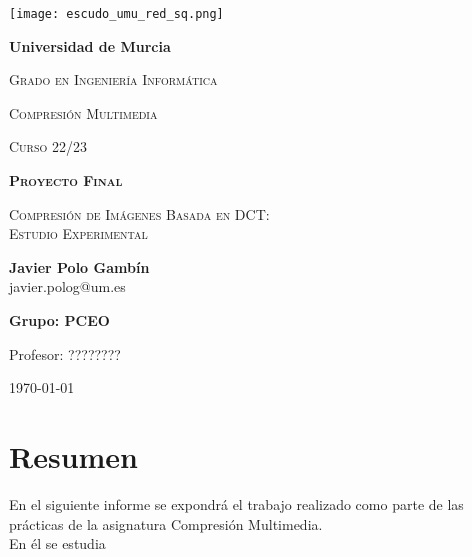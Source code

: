 \documentclass[12pt,a4paper]{article}
\begin{document}
\begin{titlepage}
\centering
{\texttt{[image: escudo\_umu\_red\_sq.png]}\par}
\vspace{1cm}
{\bfseries\LARGE Universidad de Murcia \par}
\vspace{0.5cm}
{\scshape\Large Grado en Ingeniería Informática \par}
\vspace{0.5cm}
{\scshape\Large Compresión Multimedia \par}
{\scshape\Large Curso 22/23 \par}
\vspace{1cm}
{\scshape\Huge \textbf{Proyecto Final\\} \par}
\vspace{0.5cm}
{\scshape \Large Compresión de Imágenes Basada en DCT:\\Estudio Experimental \par}
\vspace{1.5cm}
\vfill


{ \Large\textbf{Javier Polo Gambín} \\
javier.polog@um.es\par}
\vspace{0.7cm}
{\textbf{Grupo: PCEO}\par}
\vspace{0.7cm}
\vfill
{\large Profesor: ???????? \par}
\vfill
{\Large \date{\today} \par}
\vfill
{\large \today \par}
\end{titlepage}

\newpage

\tableofcontents
\newpage 
\listoffigures

\setcounter{tocdepth}{2}

\newpage








\section{Resumen}
En el siguiente informe se expondrá el trabajo realizado como parte de las prácticas de la asignatura Compresión Multimedia.\\

En él se estudia 
\end{document}
